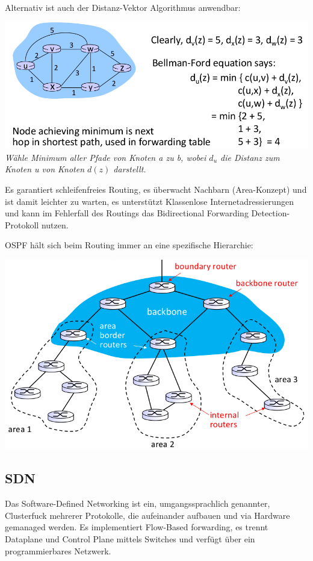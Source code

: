 \documentclass{scrartcl}
\begin{document}
Alternativ ist auch der Distanz-Vektor Algorithmus anwendbar:
    \begin{center}
        \includegraphics[width=\textwidth]{DistanceVector.png}\\
    \textit{Wähle Minimum aller Pfade von Knoten a zu b, wobei $d_u$ die Distanz zum Knoten u von Knoten $d(z)$ darstellt.}
    \end{center}
    
    Es garantiert schleifenfreies Routing, es überwacht Nachbarn (Area-Konzept) und ist damit leichter zu warten, es unterstützt Klassenlose Internetadressierungen und kann im Fehlerfall des Routings das Bidirectional Forwarding Detection-Protokoll nutzen.
    
    OSPF hält sich beim Routing immer an eine spezifische Hierarchie:
    \begin{center}
        \includegraphics[width=\textwidth]{HierarchicalOSPF.png}
    \end{center}
    
    \subsection{SDN}
    Das Software-Defined Networking ist ein, umgangssprachlich genannter, Clusterfuck mehrerer Protokolle, die aufeinander aufbauen und via Hardware gemanaged werden.
    Es implementiert Flow-Based forwarding, es trennt Dataplane und Control Plane mittels Switches und verfügt über ein programmierbares Netzwerk.
\end{document}

